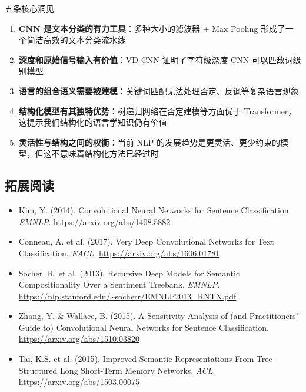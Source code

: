 \begin{importantbox}{五条核心洞见}
\begin{enumerate}
    \item \textbf{CNN 是文本分类的有力工具}：多种大小的滤波器 + Max Pooling 形成了一个简洁高效的文本分类流水线
    \item \textbf{深度和原始信号输入有价值}：VD-CNN 证明了字符级深度 CNN 可以匹敌词级别模型
    \item \textbf{语言的组合语义需要被建模}：关键词匹配无法处理否定、反讽等复杂语言现象
    \item \textbf{结构化模型有其独特优势}：树递归网络在否定建模等方面优于 Transformer，这提示我们结构化的语言学知识仍有价值
    \item \textbf{灵活性与结构之间的权衡}：当前 NLP 的发展趋势是更灵活、更少约束的模型，但这不意味着结构化方法已经过时
\end{enumerate}
\end{importantbox}

\subsection{拓展阅读}

\begin{itemize}
    \item Kim, Y. (2014). Convolutional Neural Networks for Sentence Classification. \textit{EMNLP}. \url{https://arxiv.org/abs/1408.5882}
    \item Conneau, A. et al. (2017). Very Deep Convolutional Networks for Text Classification. \textit{EACL}. \url{https://arxiv.org/abs/1606.01781}
    \item Socher, R. et al. (2013). Recursive Deep Models for Semantic Compositionality Over a Sentiment Treebank. \textit{EMNLP}. \url{https://nlp.stanford.edu/~socherr/EMNLP2013_RNTN.pdf}
    \item Zhang, Y. \& Wallace, B. (2015). A Sensitivity Analysis of (and Practitioners' Guide to) Convolutional Neural Networks for Sentence Classification. \url{https://arxiv.org/abs/1510.03820}
    \item Tai, K.S. et al. (2015). Improved Semantic Representations From Tree-Structured Long Short-Term Memory Networks. \textit{ACL}. \url{https://arxiv.org/abs/1503.00075}
\end{itemize}


